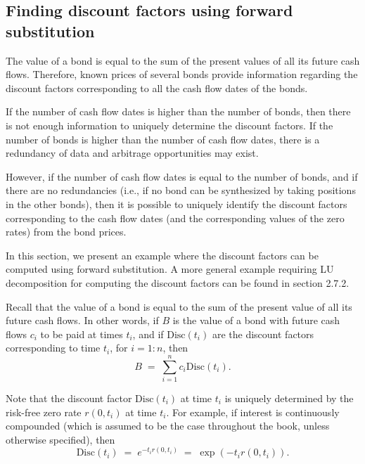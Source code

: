 
\subsection{Finding discount factors using forward substitution}

The value of a bond is equal to the sum of the present values of all its future cash
flows. Therefore, known prices of several bonds provide information regarding the
discount factors corresponding to all the cash flow dates of the bonds.

If the number of cash flow dates is higher than the number of bonds, then there is not
enough information to uniquely determine the discount factors. If the number of bonds
is higher than the number of cash flow dates, there is a redundancy of data and
arbitrage opportunities may exist.

However, if the number of cash flow dates is equal to the number of bonds, and if
there are no redundancies (i.e., if no bond can be synthesized by taking positions in
the other bonds), then it is possible to uniquely identify the discount factors
corresponding to the cash flow dates (and the corresponding values of the zero rates)
from the bond prices.

In this section, we present an example where the discount factors can be computed
using forward substitution. A more general example requiring LU decomposition for
computing the discount factors can be found in section 2.7.2.

Recall that the value of a bond is equal to the sum of the present value of all its
future cash flows. In other words, if $B$ is the value of a bond with future cash
flows $c_i$ to be paid at times $t_i$, and if $\text{Disc}(t_i)$ are the discount
factors corresponding to time $t_i$, for $i=1:n$, then
\begin{equation}
B \;=\; \sum_{i=1}^n c_i\text{Disc}(t_i).
\end{equation}

Note that the discount factor $\text{Disc}(t_i)$ at time $t_i$ is uniquely determined
by the risk-free zero rate $r(0,t_i)$ at time $t_i$. For example, if interest is
continuously compounded (which is assumed to be the case throughout the book, unless
otherwise specified), then
\begin{equation}
\text{Disc}(t_i) \;=\; e^{-t_ir(0,t_i)} \;=\; \exp\left(-t_ir(0,t_i)\right).
\end{equation}

